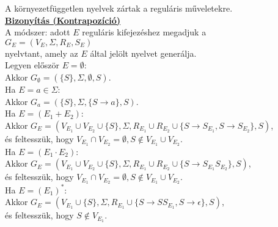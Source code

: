 \documentclass{beamer}
\newcommand{\msmallskip}{\vspace{0.3em}}
\newcommand{\mmedskip}{\vspace{0.5em}}
\newcommand{\mbigskip}{\vspace{1em}}
\begin{document}
\begin{frame}
\begin{tcolorbox}[squeezed title={Tétel: Környezetfüggetlen nyelvek műveleti zártsága}]
A környezetfüggetlen nyelvek zártak a reguláris műveletekre.\\
\tcblower
\msmallskip
\underline{\textbf{Bizonyítás (Kontrapozíció)}}\\
\mmedskip
A módszer: adott $E$ reguláris kifejezéshez megadjuk a\\
$G_E = (V_E, {\Sigma}, R_E, S_E)$\\
nyelvtant, amely az $E$ által jelölt nyelvet generálja.\\
\mbigskip
Legyen először $E = \emptyset$:\\
Akkor $G_{\emptyset} = (\{S\}, {\Sigma}, \emptyset, S)$.\\
\mbigskip
Ha $E = a \in {\Sigma}$:\\
Akkor $G_a = (\{S\}, {\Sigma}, \{S \rightarrow a\}, S)$.\\
\mbigskip
Ha $E = (E_1 + E_2)$:\\
Akkor $G_E = (V_{E_1} \cup V_{E_2} \cup \{S\}, \Sigma, R_{E_1} \cup R_{E_2} \cup \{S \rightarrow S_{E_1}, S \rightarrow S_{E_2}\}, S)$,\\
és feltesszük, hogy $V_{E_1} \cap V_{E_2} = {\emptyset}, S \notin V_{E_1} \cup V_{E_2}$.\\
\mbigskip
Ha $E = (E_1 \cdot E_2)$:\\
Akkor $G_E = (V_{E_1} \cup V_{E_2} \cup \{S\}, \Sigma, R_{E_1} \cup R_{E_2} \cup \{S \rightarrow S_{E_1}S_{E_2}\}, S)$,\\
és feltesszük, hogy $V_{E_1} \cap V_{E_2} = {\emptyset}, S \notin V_{E_1} \cup V_{E_2}$.\\
\mbigskip
Ha $E = (E_1)^*$:\\
Akkor $G_E = (V_{E_1} \cup \{S\}, \Sigma, R_{E_1} \cup \{S \rightarrow SS_{E_1}, S \rightarrow \epsilon \}, S)$,\\
és feltesszük, hogy $S \notin V_{E_1}$.\\

\end{tcolorbox}
\end{frame}
\end{document}
